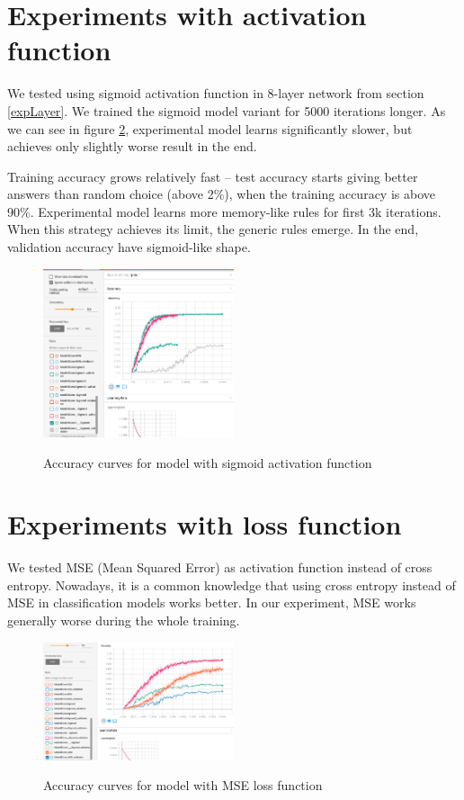 \documentclass[a4paper]{article}
\begin{document}
\section{Experiments with activation function}

We tested using sigmoid activation function in 8-layer network from section \ref{expLayer}.
We trained the sigmoid model variant for 5000 iterations longer.
As we can see in figure \ref{fig:sigmoid}, experimental model learns significantly slower,
but achieves only slightly worse result in the end.

Training accuracy grows relatively fast -- test accuracy
starts giving better answers than random choice (above 2\%),
when the training accuracy is above 90\%.
Experimental model learns more memory-like rules for first 3k iterations.
When this strategy achieves its limit, the generic rules emerge.
In the end, validation accuracy have sigmoid-like shape.



\begin{figure}[!hbt]
    \centering
    \includegraphics[page=2,width=0.5\textwidth]{sigmoidConv.png}
    \label{fig:sigmoid}
    \caption[]{Accuracy curves for model with sigmoid activation function}
\end{figure}


\section{Experiments with loss function}

We tested MSE (Mean Squared Error) as activation function instead of cross entropy.
Nowadays, it is a common knowledge that using cross entropy instead of
MSE in classification models works better.
In our experiment, MSE works generally worse during the whole training.

\begin{figure}[!hbt]
    \centering
    \includegraphics[page=2,width=0.5\textwidth]{sqrLoss.png}
    \label{fig:sigmoid}
    \caption[]{Accuracy curves for model with MSE loss function}
\end{figure}
\end{document}
